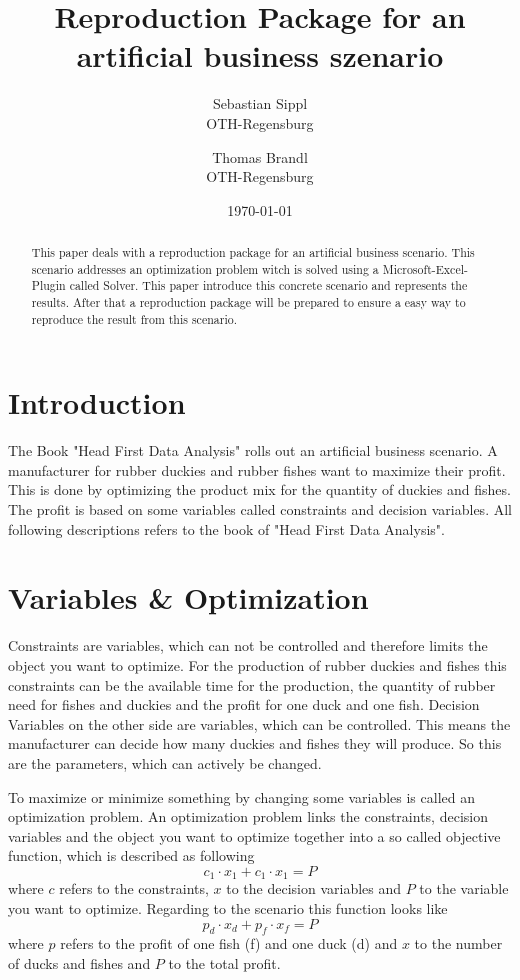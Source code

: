 \documentclass{article}
\title{\textbf{Reproduction Package for an artificial business szenario}}
\author{Sebastian Sippl  \\
	OTH-Regensburg  \\
	\and 
	Thomas Brandl \\
	OTH-Regensburg  \\
	}
\date{\today}
\begin{document}
\maketitle
\begin{abstract}
This paper deals with a reproduction package for an artificial business scenario. This scenario addresses an optimization problem witch is solved using a Microsoft-Excel-Plugin called Solver. This paper introduce this concrete scenario and represents the results. After that a reproduction package will be prepared to ensure a easy way to reproduce the result from this scenario.
\end{abstract}

\begin{multicols}{2}

\section{Introduction}
The Book "Head First Data Analysis" \cite{micheal} rolls out an artificial business scenario. A manufacturer for rubber duckies and rubber fishes want to maximize their profit. This is done by optimizing the product mix for the quantity of duckies and fishes. The profit is based on some variables called constraints and decision variables. All following descriptions refers to the book of "Head First Data Analysis".

\section{Variables \& Optimization}
Constraints are variables, which can not be controlled and therefore limits the object you want to optimize. For the production of rubber duckies and fishes this constraints can be the available time for the production, the quantity of rubber need for fishes and duckies and the profit for one duck and one fish. Decision Variables on the other side are variables, which can be controlled. This means the manufacturer can decide how many duckies and fishes they will produce. So this are the parameters, which can actively be changed. 

To maximize or minimize something by changing some variables is called an optimization problem. An optimization problem links the constraints, decision variables and the object you want to optimize together into a so called objective function, which is described as following
\begin{equation}
c_{1}\cdot x_{1} + c_{1}\cdot x_{1} = P
\end{equation}
where $c$ refers to the constraints, $x$ to the decision variables and $P$ to the variable you want to optimize. Regarding to the scenario this function looks like 
\begin{equation}
p_{d}\cdot x_{d} + p_{f}\cdot x_{f} = P
\end{equation}
where $p$ refers to the profit of one fish (f) and one duck (d) and $x$ to the number of ducks and fishes and $P$ to the total profit.


\end{multicols}
\end{document}
